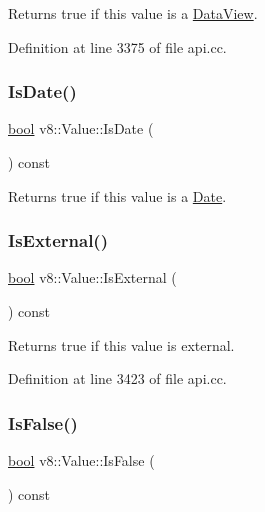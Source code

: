 Returns true if this value is a \mbox{\hyperlink{classv8_1_1DataView}{Data\+View}}. 

Definition at line 3375 of file api.\+cc.

\mbox{\label{classv8_1_1Value_aa94f94744aed4d5e731eacf52c8b4801}} 
\subsubsection{\texorpdfstring{Is\+Date()}{IsDate()}}
{\footnotesize\ttfamily \mbox{\hyperlink{classbool}{bool}} v8\+::\+Value\+::\+Is\+Date (\begin{DoxyParamCaption}{ }\end{DoxyParamCaption}) const}

Returns true if this value is a \mbox{\hyperlink{classv8_1_1Date}{Date}}. \mbox{\label{classv8_1_1Value_a908070323b8cd593127141a22b79e39d}} 
\subsubsection{\texorpdfstring{Is\+External()}{IsExternal()}}
{\footnotesize\ttfamily \mbox{\hyperlink{classbool}{bool}} v8\+::\+Value\+::\+Is\+External (\begin{DoxyParamCaption}{ }\end{DoxyParamCaption}) const}

Returns true if this value is external. 

Definition at line 3423 of file api.\+cc.

\mbox{\label{classv8_1_1Value_a84b6682c5582e0ae14d85bd9b6f25522}} 
\subsubsection{\texorpdfstring{Is\+False()}{IsFalse()}}
{\footnotesize\ttfamily \mbox{\hyperlink{classbool}{bool}} v8\+::\+Value\+::\+Is\+False (\begin{DoxyParamCaption}{ }\end{DoxyParamCaption}) const}

